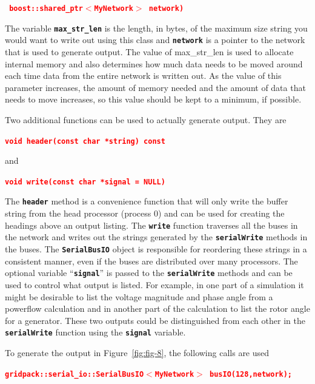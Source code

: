 \documentclass[12pt]{report} %
\begin{document}
\textcolor{red}{\texttt{\textbf{   boost::shared\_ptr$\boldsymbol{\mathrm{<}}$MyNetwork$\boldsymbol{\mathrm{>}}$ network)}}}

The variable \texttt{\textbf{max\_str\_len}} is the length, in bytes, of the maximum size string you would want to write out using this class and \texttt{\textbf{network}} is a pointer to the network that is used to generate output. The value of max\_str\_len is used to allocate internal memory and also determines how much data needs to be moved around each time data from the entire network is written out. As the value of this parameter increases, the amount of memory needed and the amount of data that needs to move increases, so this value should be kept to a minimum, if possible. 

Two additional functions can be used to actually generate output. They are

\textcolor{red}{\texttt{\textbf{void header(const char *string) const}}}

and 

\textcolor{red}{\texttt{\textbf{void write(const char *signal = NULL)}}}

The \texttt{\textbf{header}} method is a convenience function that will only write the buffer string from the head processor (process 0) and can be used for creating the headings above an output listing. The \texttt{\textbf{write}} function traverses all the buses in the network and writes out the strings generated by the \texttt{\textbf{serialWrite}} methods in the buses. The \texttt{\textbf{SerialBusIO}} object is responsible for reordering these strings in a consistent manner, even if the buses are distributed over many processors. The optional variable ``\texttt{\textbf{signal}}'' is passed to the \texttt{\textbf{serialWrite}} methods and can be used to control what output is listed. For example, in one part of a simulation it might be desirable to list the voltage magnitude and phase angle from a powerflow calculation and in another part of the calculation to list the rotor angle for a generator. These two outputs could be distinguished from each other in the \texttt{\textbf{serialWrite}} function using the \texttt{\textbf{signal}} variable.

To generate the output in Figure~\ref{fig:fig-8}, the following calls are used

\textcolor{red}{\texttt{\textbf{gridpack::serial\_io::SerialBusIO$\boldsymbol{\mathrm{<}}$MyNetwork$\boldsymbol{\mathrm{>}}$ busIO(128,network);}}}
\end{document}
